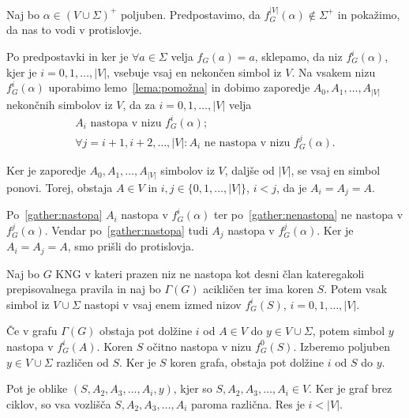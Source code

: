 \documentclass[fin1, tisk]{fmfdelo}
\providecommand{\abs}[1]{\left\lvert #1 \right\rvert}
\theoremstyle{definition}
\begin{document}
\begin{dokaz}
    Naj bo $ \alpha \in ( V \cup \Sigma)^+ $ poljuben. Predpostavimo, da 
    $ f^{\abs{V} }_G(\alpha) \notin \Sigma^+ $ in pokažimo, da nas to vodi v
    protislovje.

    Po predpostavki in ker je $\forall a \in \Sigma$ velja $f_G(a) = a$, sklepamo, da niz 
    $f^i_G(\alpha)$, kjer je $i= 0, 1, \ldots, \abs{V}$, vsebuje vsaj en nekončen simbol iz $V$. 
    Na vsakem nizu $f^i_G(\alpha)$ uporabimo lemo~\ref{lema:pomožna} in dobimo zaporedje 
    $A_0, A_1, \ldots, A_{\abs{V}}$ nekončnih simbolov iz $V$, da za $i= 0, 1, \ldots, \abs{V}$ 
    velja
    \begin{gather}
            A_i \text{ nastopa v nizu } f^i_G(\alpha); \label{gather:nastopa} \\
            \forall j = i+1, i+2, \ldots, \abs{V} \colon A_i \text{ 
            ne nastopa v nizu } f^j_G(\alpha). \label{gather:nenastopa}
    \end{gather}
    
    Ker je zaporedje $A_0, A_1, \ldots, A_{\abs{V}}$ simbolov iz $V$, daljše od $\abs{V}$, se vsaj
    en simbol ponovi. Torej, obstaja $A \in V$ in $i,j \in \{0, 1, \ldots, \abs{V} \}$, $i<j$, 
    da je $A_i = A_j = A$.

    Po~\ref{gather:nastopa} $A_i$ nastopa v $f^i_G(\alpha)$ ter po~\ref{gather:nenastopa} ne 
    nastopa v $f^j_G(\alpha)$. Vendar po~\ref{gather:nastopa} tudi $A_j$ nastopa v $f^j_G(\alpha)$.
    Ker je $A_i = A_j = A$, smo prišli do protislovja.
\end{dokaz}

\begin{lema}\label{lema:nastopanje}
    Naj bo $G$ KNG v kateri prazen niz ne nastopa kot desni član 
    kateregakoli prepisovalnega pravila in naj bo $\Gamma(G)$ acikličen ter ima
    koren $S$. Potem vsak simbol iz $V \cup \Sigma$ nastopi v vsaj enem izmed nizov $f^i_G(S)$, 
    $i= 0, 1, \ldots, \abs{V}$. 
\end{lema}

\begin{dokaz}
    Če v grafu $\Gamma(G)$ obstaja pot dolžine $i$ od $A \in V$ do $y \in V \cup \Sigma$, potem
    simbol $y$ nastopa v $f^i_G(A)$. Koren $S$ očitno nastopa v nizu $f^0_G(S)$. Izberemo poljuben
    $y \in V \cup \Sigma$ različen od $S$. Ker je $S$ koren grafa, obstaja pot dolžine 
    $i$ od $S$ do $y$. 
     
    Pot je oblike $(S, A_2, A_3, \ldots, A_i, y)$, kjer so $S, A_2, A_3, \ldots, A_i \in V$. Ker 
    je graf brez ciklov, so vsa vozlišča $S, A_2, A_3, \ldots, A_i$ paroma različna. Res je 
    $i < \abs{V}$.
\end{dokaz}
\end{document}
